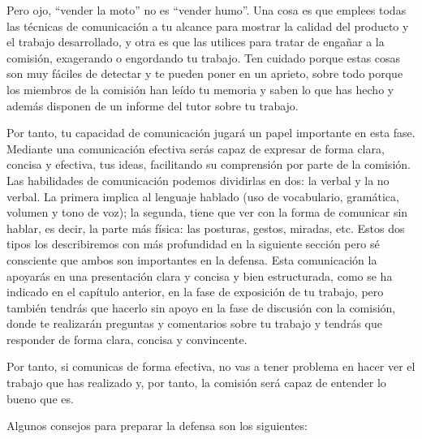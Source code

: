 Pero ojo, ``vender la moto'' no es ``vender humo''. Una cosa es que emplees todas las técnicas de comunicación a tu alcance para mostrar la calidad del producto y el trabajo desarrollado, y otra es que las utilices para tratar de engañar a la comisión, exagerando o engordando tu trabajo. Ten cuidado porque estas cosas son muy fáciles de detectar y te pueden poner en un aprieto, sobre todo porque los miembros de la comisión han leído tu memoria y saben lo que has hecho y además disponen de un informe del tutor sobre tu trabajo.

Por tanto, tu capacidad de comunicación jugará un papel importante en esta fase. Mediante una comunicación efectiva serás capaz de expresar de forma clara, concisa y efectiva, tus ideas, facilitando su comprensión por parte de la comisión. Las habilidades de comunicación podemos dividirlas en dos: la verbal y la no verbal. La primera implica al lenguaje hablado (uso de vocabulario, gramática, volumen y tono de voz); la segunda, tiene que ver con la forma de comunicar sin hablar, es decir, la parte más física: las posturas, gestos, miradas, etc. Estos dos tipos los describiremos con más profundidad en la siguiente sección pero sé consciente que ambos son importantes en la defensa. Esta comunicación la apoyarás en una presentación clara y concisa y bien estructurada, como se ha indicado en el capítulo anterior, en la fase de exposición de tu trabajo, pero también tendrás que hacerlo sin apoyo en la fase de discusión con la comisión, donde te realizarán preguntas y comentarios sobre tu trabajo y tendrás que responder de forma clara, concisa y convincente.

Por tanto, si comunicas de forma efectiva, no vas a tener problema en hacer ver el trabajo que has realizado y, por tanto, la comisión será capaz de entender lo bueno que es. 

Algunos consejos para preparar la defensa son los siguientes:

